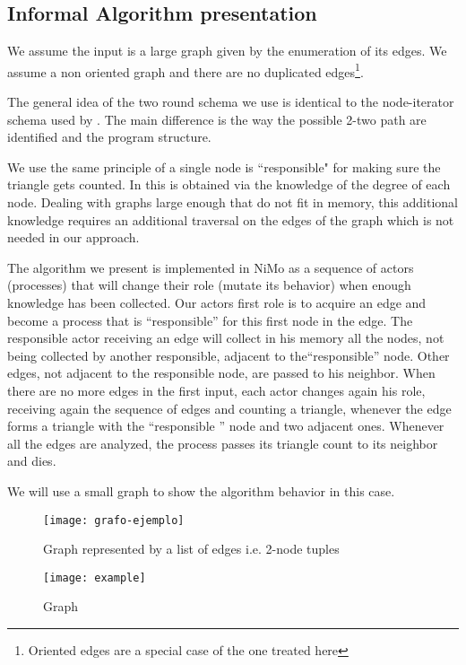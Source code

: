 \documentclass{article}                     \usepackage{graphics}
\begin{document}
\subsection{Informal Algorithm presentation}\label{informal}


We assume the input is a large graph given by the enumeration of its edges. We assume a non oriented graph and there are no duplicated edges\footnote{Oriented edges are a special case of the one treated here}.

The general idea of the  two round schema we use is identical to the node-iterator schema used by  \cite{Suri:2011:CTC:1963405.1963491}. The main difference is the way the possible 2-two path are identified and the program structure.

We use the same principle of a single node is  ``responsible"  for making sure the triangle gets counted. In  \cite{citeulike:8568862}   this is obtained via the knowledge of the degree of each node. Dealing with graphs large enough that do not fit in memory, this additional knowledge requires an additional traversal on the edges of the graph which is not needed in our approach.

The algorithm we present is implemented in NiMo as a sequence of actors (processes) that will change their role (mutate its behavior) when  enough knowledge has been collected.  Our actors first role  is to acquire an edge and become a process that is ``responsible'' for this first node in the edge. The responsible actor receiving an edge will collect in his memory all the nodes, not being collected by another responsible, adjacent  to the``responsible'' node. Other edges, not adjacent to the responsible node,  are passed to his neighbor.  When there are no more edges in the first input,  each actor changes again his role, receiving again the sequence of edges and counting a triangle, whenever the edge forms a triangle with  the ``responsible ''  node and two adjacent ones.  Whenever all the edges are analyzed, the process passes its triangle count to its neighbor and dies.


We will use a small graph to show the algorithm behavior in this case.
\begin{figure}[h]
	\centering
	\texttt{[image: grafo-ejemplo]}
	\caption{Graph represented by a list of edges i.e. 2-node tuples}
	\label{data}
\end{figure}

 \begin{figure}[h]
	\centering
	\texttt{[image: example]}
	\caption{Graph}
	\label{graph}
\end{figure}
\end{document}
